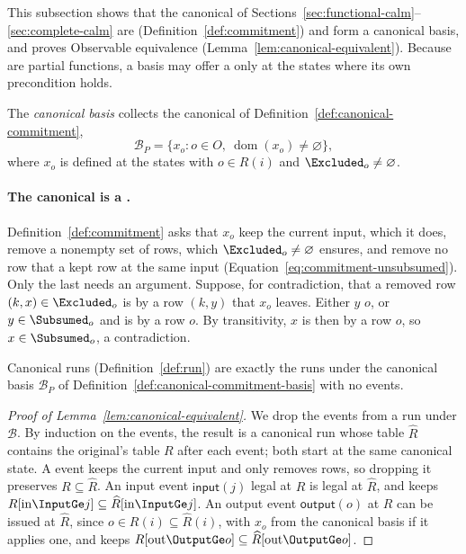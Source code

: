 This subsection shows that the canonical \commitments of
Sections~\ref{sec:functional-calm}--\ref{sec:complete-calm} are \commitments
(Definition~\ref{def:commitment}) and form a canonical basis, and proves
Observable equivalence (Lemma~\ref{lem:canonical-equivalent}).  Because
\commitments are partial functions, a basis may offer a \commitment only at the
states where its own precondition holds.

\begin{definition}
\label{def:canonical-commitment-basis}
The \emph{canonical \commitment basis} collects the canonical \commitments of
Definition~\ref{def:canonical-commitment},
\begin{equation}
  \mathcal B_P
    =\{x_o:o\in O,\ \operatorname{dom}(x_o)\neq\varnothing\},
  \label{eq:canonical-commitment-basis-relational}
\end{equation}
where $x_o$ is defined at the states with $o\in R(i)$ and $\Excluded_o\neq\varnothing$.
\end{definition}

\paragraph{The canonical \commitment is a \commitment.}
Definition~\ref{def:commitment} asks that $x_o$ keep the current input, which
it does, remove a nonempty set of rows, which $\Excluded_o\neq\varnothing$
ensures, and remove no row that a kept row at the same input \outrel
(Equation~\ref{eq:commitment-unsubsumed}).  Only the last needs an argument.
Suppose, for contradiction, that a removed row $(k,x)\in\Excluded_o$ is
\outrelpast by a row $(k,y)$ that $x_o$ leaves.  Either $y$ \outrel $o$, or
$y\in\Subsumed_o$ and is \outrelpast by a row \outrelpart $o$.  By
transitivity, $x$ is then \outrelpast by a row \outrelpart $o$, so
$x\in\Subsumed_o$, a contradiction.

Canonical runs (Definition~\ref{def:run}) are exactly the runs under the
canonical basis $\mathcal B_P$ of Definition~\ref{def:canonical-commitment-basis}
with no \commitment events.

\begin{proof}[Proof of Lemma~\ref{lem:canonical-equivalent}]
We drop the \commitment events from a run under $\mathcal B$.  By induction on
the events, the result is a canonical run whose table $\widehat R$ contains
the original's table $R$ after each event; both start at the same canonical
state.  A \commitment event keeps the current input and only removes rows, so
dropping it preserves $R\subseteq\widehat R$.  An input event
$\mathsf{input}(j)$ legal at $R$ is legal at $\widehat R$, and keeps
$R[\mathrm{in}\InputGe j]\subseteq\widehat R[\mathrm{in}\InputGe j]$.  An
output event $\mathsf{output}(o)$ at $R$ can be issued at $\widehat R$, since
$o\in R(i)\subseteq\widehat R(i)$, with $x_o$ from the canonical basis if it
applies one, and keeps
$R[\mathrm{out}\OutputGe o]\subseteq\widehat R[\mathrm{out}\OutputGe o]$.
\end{proof}

